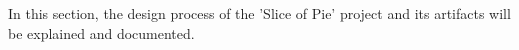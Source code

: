 In this section, the design process of the 'Slice of Pie' project and its artifacts will be explained and documented.


